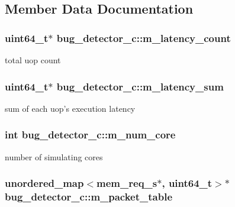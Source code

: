 \subsection{Member Data Documentation}
\hypertarget{classbug__detector__c_a40b39407ec6f0e2e0888cac9a7486453}{
\subsubsection[{m\_\-latency\_\-count}]{\setlength{\rightskip}{0pt plus 5cm}uint64\_\-t$\ast$ {\bf bug\_\-detector\_\-c::m\_\-latency\_\-count}}}
\label{classbug__detector__c_a40b39407ec6f0e2e0888cac9a7486453}
total uop count \hypertarget{classbug__detector__c_ae1a942538a13d23d8bee7355c7e22e0c}{
\subsubsection[{m\_\-latency\_\-sum}]{\setlength{\rightskip}{0pt plus 5cm}uint64\_\-t$\ast$ {\bf bug\_\-detector\_\-c::m\_\-latency\_\-sum}}}
\label{classbug__detector__c_ae1a942538a13d23d8bee7355c7e22e0c}
sum of each uop's execution latency \hypertarget{classbug__detector__c_a3d90d9bf03b550875f24acc533352640}{
\subsubsection[{m\_\-num\_\-core}]{\setlength{\rightskip}{0pt plus 5cm}int {\bf bug\_\-detector\_\-c::m\_\-num\_\-core}}}
\label{classbug__detector__c_a3d90d9bf03b550875f24acc533352640}
number of simulating cores \hypertarget{classbug__detector__c_a650c89720f96ea9c79230e7341b88885}{
\subsubsection[{m\_\-packet\_\-table}]{\setlength{\rightskip}{0pt plus 5cm}unordered\_\-map$<${\bf mem\_\-req\_\-s}$\ast$, uint64\_\-t$>$$\ast$ {\bf bug\_\-detector\_\-c::m\_\-packet\_\-table}}}
